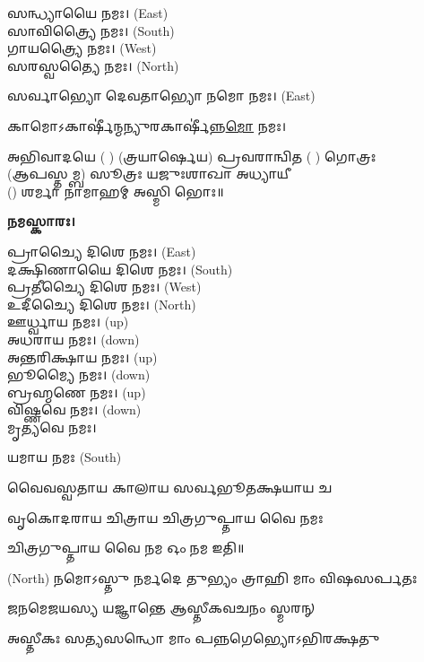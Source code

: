 
𑌸𑌨𑍍𑌧𑍍𑌯𑌾𑌯𑍈 𑌨𑌮𑌃।  {\scriptsize (East)}\\
𑌸𑌾𑌵𑌿𑌤𑍍𑌰𑍍𑌯𑍈 𑌨𑌮𑌃। {\scriptsize (South)}\\
𑌗𑌾𑌯𑌤𑍍𑌰𑍍𑌯𑍈 𑌨𑌮𑌃।  {\scriptsize (West)}\\
𑌸𑌰𑌸𑍍𑌵𑌤𑍍𑌯𑍈 𑌨𑌮𑌃।  {\scriptsize (North)}

𑌸𑌰𑍍𑌵𑌾𑌭𑍍𑌯𑍋 𑌦𑍇𑌵𑌤𑌾𑌭𑍍𑌯𑍋 𑌨𑌮𑍋 𑌨𑌮𑌃। {\scriptsize (East)}

𑌕𑌾𑌮𑍋𑌽𑌕𑌾𑌰𑍍\mbox{}𑌷𑍀॑𑌨𑍍𑌮𑌨𑍍𑌯𑍁𑌰𑌕𑌾𑌰𑍍\mbox{}𑌷𑍀॑𑌨𑍍𑌨\-\ul{𑌮𑍋} 𑌨𑌮𑌃।

𑌅𑌭𑌿𑌵𑌾𑌦𑌯𑍇 ( ) (𑌤𑍍𑌰𑌯𑌾𑌰𑍍𑌷𑍇𑌯) 𑌪𑍍𑌰𑌵𑌰𑌾𑌨𑍍𑌵𑌿𑌤 ( ) 𑌗𑍋𑌤𑍍𑌰𑌃\\
(𑌆𑌪𑌸𑍍𑌤𑌮𑍍𑌬) 𑌸𑍂𑌤𑍍𑌰𑌃 𑌯𑌜𑍁𑌃𑌶𑌾𑌖𑌾 𑌅𑌧𑍍𑌯𑌾𑌯𑍀\\
() 𑌶𑌰𑍍𑌮𑌾 𑌨𑌾𑌮𑌾𑌹𑌮𑍍 𑌅𑌸𑍍𑌮𑌿 𑌭𑍋𑌃॥

\textbf{𑌨𑌮𑌸𑍍𑌕𑌾𑌰𑌃।}


𑌪𑍍𑌰𑌾𑌚𑍍𑌯𑍈 𑌦𑌿𑌶𑍇 𑌨𑌮𑌃।   {\scriptsize (East)}\\
𑌦𑌕𑍍𑌷𑌿𑌣𑌾𑌯𑍈 𑌦𑌿𑌶𑍇 𑌨𑌮𑌃।  {\scriptsize (South)}\\
𑌪𑍍𑌰𑌤𑍀𑌚𑍍𑌯𑍈 𑌦𑌿𑌶𑍇 𑌨𑌮𑌃।   {\scriptsize (West)}\\
𑌉𑌦𑍀𑌚𑍍𑌯𑍈 𑌦𑌿𑌶𑍇 𑌨𑌮𑌃।   {\scriptsize (North)}\\
𑌊𑌰𑍍𑌧𑍍𑌵𑌾𑌯 𑌨𑌮𑌃।   {\scriptsize (up)}\\
𑌅𑌧𑌰𑌾𑌯 𑌨𑌮𑌃।   {\scriptsize (down)}\\
𑌅𑌨𑍍𑌤𑌰𑌿𑌕𑍍𑌷𑌾𑌯 𑌨𑌮𑌃। {\scriptsize (up)}\\
𑌭𑍂𑌮𑍍𑌯𑍈 𑌨𑌮𑌃। {\scriptsize (down)}\\
𑌬𑍍𑌰𑌹𑍍𑌮𑌣𑍇 𑌨𑌮𑌃। {\scriptsize (up)}\\
𑌵𑌿𑌷𑍍𑌣𑌵𑍇 𑌨𑌮𑌃।  {\scriptsize (down)}\\
𑌮𑍃𑌤𑍍𑌯𑌵𑍇 𑌨𑌮𑌃।

𑌯𑌮𑌾𑌯 𑌨𑌮𑌃   {\scriptsize (South)}

{𑌵𑍈𑌵𑌸𑍍𑌵𑌤𑌾𑌯   𑌕𑌾𑌲𑌾𑌯   𑌸𑌰𑍍𑌵𑌭𑍂𑌤𑌕𑍍𑌷𑌯𑌾𑌯   𑌚}

{𑌵𑍃𑌕𑍋𑌦𑌰𑌾𑌯   𑌚𑌿𑌤𑍍𑌰𑌾𑌯   𑌚𑌿𑌤𑍍𑌰𑌗𑍁𑌪𑍍𑌤𑌾𑌯   𑌵𑍈  𑌨𑌮𑌃}

𑌚𑌿𑌤𑍍𑌰𑌗𑍁𑌪𑍍𑌤𑌾𑌯   𑌵𑍈  𑌨𑌮 𑌓𑌂 𑌨𑌮 𑌇𑌤𑌿॥

 {\scriptsize (North)}
{𑌨𑌮𑍋𑌽𑌸𑍍𑌤𑍁 𑌨𑌰𑍍𑌮𑌦𑍇 𑌤𑍁𑌭𑍍𑌯𑌂 𑌤𑍍𑌰𑌾𑌹𑌿 𑌮𑌾𑌂 𑌵𑌿𑌷𑌸𑌰𑍍𑌪𑌤𑌃}

{𑌜𑌨𑌮𑍇𑌜𑌯𑌸𑍍𑌯 𑌯𑌜𑍍𑌞𑌾𑌨𑍍𑌤𑍇 𑌆𑌸𑍍𑌤𑍀𑌕𑌵𑌚𑌨𑌂 𑌸𑍍𑌮𑌰𑌨𑍍}


{𑌅𑌸𑍍𑌤𑍀𑌕𑌃 𑌸𑌤𑍍𑌯𑌸𑌨𑍍𑌧𑍋 𑌮𑌾𑌂 𑌪𑌨𑍍𑌨𑌗𑍇𑌭𑍍𑌯𑍋𑌽𑌭𑌿𑌰𑌕𑍍𑌷𑌤𑍁}

